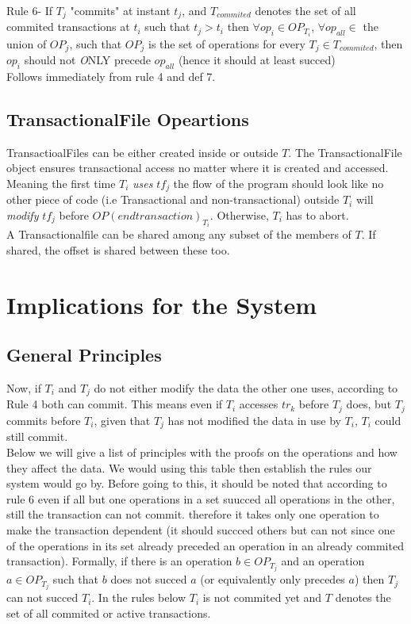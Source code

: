 \documentclass[a4paper, 11pt]{article}
\begin{document}
Rule 6- If $T_j$ "commits" at instant $t_j$, and $T_{commited}$ denotes the set of all commited transactions at $t_i$ such that $t_j > t_i$ then $\forall op_i \in OP_{T_i}$, $\forall op_{all} \in$ the union of $OP_j$, such that $OP_j$ is the set of operations  for every $T_j \in T_{commited}$, then $op_i$  should not \emph ONLY precede $op_{all}$ (hence it should at least succed)\\

Follows immediately from rule 4 and def 7. 

\subsection{TransactionalFile Opeartions}
TransactioalFiles can be either created inside or outside $T$. The TransactionalFile object ensures transactional access no matter where it is created and accessed. Meaning the first time $T_i$ \emph {uses} $tf_j$ the flow of the program should look like no other piece of code (i.e Transactional and non-transactional) outside $T_i$ will \emph {modify} $tf_j$ before $OP(endtransaction)_{T_i}$. Otherwise, $T_i$ has to abort. \\


A Transactionalfile can be shared among any subset of the members of $T$. If shared, the offset is shared between these too. 

\section{Implications for the System}

\subsection{General Principles}
Now, if $T_i$ and $T_j$ do not either modify the data the other one uses, according to Rule 4 both can commit. This means even if $T_i$ accesses $tr_k$ before $T_j$ does, but $T_j$ commits before $T_i$, given that $T_j$ has not modified the data in use by $T_i$, $T_i$ could still commit. \\


Below we will give a list of principles with the proofs on the operations and how they affect the data. We would using this table then establish the rules our system would go by. Before going to this, it should be noted that according to rule 6 even if all but one operations in a set suucced all operations in the other, still the transaction can not commit. therefore it takes only one operation to make the transaction dependent (it should succced others but can not since one of the operations in its set already preceded an operation in an already commited transaction). Formally, if there is an operation $b \in OP_{T_j}$ and an operation $a \in OP_{T_j}$ such that $b$ does not succed $a$ (or equivalently only precedes $a$) then $T_j$ can not succed $T_i$. In the rules below $T_i$ is not commited yet and $T$ denotes the set of all commited or active transactions. \\
\end{document}

